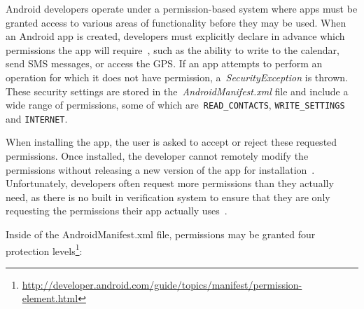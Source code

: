 \documentclass{sig-alternate}
\begin{document}



Android developers operate under a permission-based system where apps must be granted access to various areas of functionality before they may be used. When an Android app is created, developers must explicitly declare in advance which permissions the app will require~\cite{Felt:2011:APD:2046707.2046779}, such as the ability to write to the calendar, send SMS messages, or access the GPS. If an app attempts to perform an operation for which it does not have permission, a~\emph{SecurityException} is thrown. These security settings are stored in the~\emph{AndroidManifest.xml} file and include a wide range of permissions, some of which are~\texttt{READ\_CONTACTS}, \texttt{WRITE\_SETTINGS} and \texttt{INTERNET}.

When installing the app, the user is asked to accept or reject these requested permissions. Once installed, the developer cannot remotely modify the permissions without releasing a new version of the app for installation~\cite{shaerpour2013trends}. Unfortunately, developers often request more permissions than they actually need, as there is no built in verification system to ensure that they are only requesting the permissions their app actually uses~\cite{Felt:2011:APD:2046707.2046779}.


Inside of the AndroidManifest.xml file, permissions may be granted four protection levels\footnote{\url{http://developer.android.com/guide/topics/manifest/permission-element.html}}:
\end{document}
